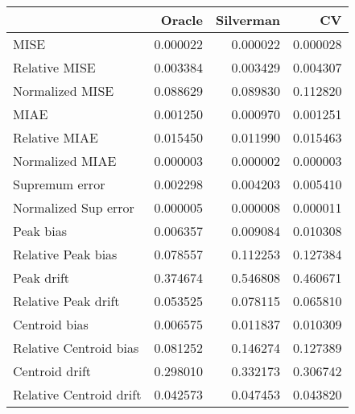 \begin{tabular}{lrrr}
  \toprule
 & Oracle & Silverman & CV \\ 
  \midrule
MISE & 0.000022 & 0.000022 & 0.000028 \\ 
  Relative MISE & 0.003384 & 0.003429 & 0.004307 \\ 
  Normalized MISE & 0.088629 & 0.089830 & 0.112820 \\ 
  MIAE & 0.001250 & 0.000970 & 0.001251 \\ 
  Relative MIAE & 0.015450 & 0.011990 & 0.015463 \\ 
  Normalized MIAE & 0.000003 & 0.000002 & 0.000003 \\ 
  Supremum error & 0.002298 & 0.004203 & 0.005410 \\ 
  Normalized Sup error & 0.000005 & 0.000008 & 0.000011 \\ 
  Peak bias & 0.006357 & 0.009084 & 0.010308 \\ 
  Relative Peak bias & 0.078557 & 0.112253 & 0.127384 \\ 
  Peak drift & 0.374674 & 0.546808 & 0.460671 \\ 
  Relative Peak drift & 0.053525 & 0.078115 & 0.065810 \\ 
  Centroid bias & 0.006575 & 0.011837 & 0.010309 \\ 
  Relative Centroid bias & 0.081252 & 0.146274 & 0.127389 \\ 
  Centroid drift & 0.298010 & 0.332173 & 0.306742 \\ 
  Relative Centroid drift & 0.042573 & 0.047453 & 0.043820 \\ 
   \bottomrule
\end{tabular}
